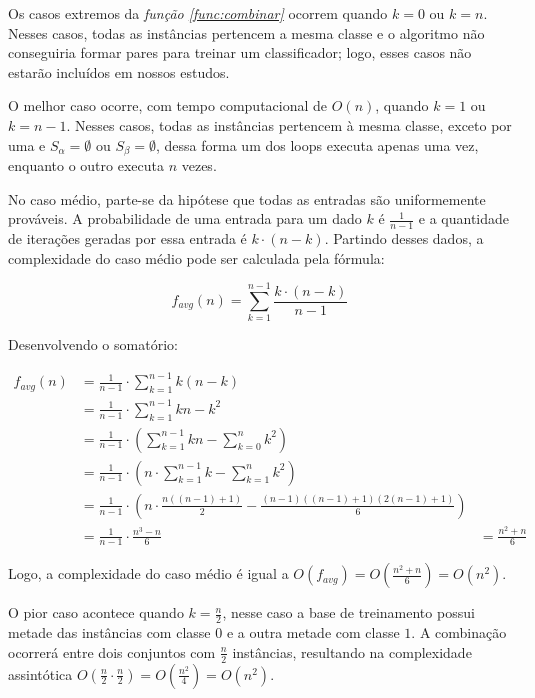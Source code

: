 Os casos extremos da \emph{função \ref{func:combinar}} ocorrem quando $k = 0$ ou $k = n$. Nesses casos, todas as instâncias pertencem a mesma classe e o algoritmo não conseguiria formar pares para treinar um classificador; logo, esses casos não estarão incluídos em nossos estudos.

O melhor caso ocorre, com tempo computacional de $O(n)$, quando $k = 1$ ou $k = n - 1$. Nesses casos, todas as instâncias pertencem à mesma classe, exceto por uma e $S_{\alpha} = \emptyset$ ou $S_{\beta} = \emptyset$, dessa forma um dos loops executa apenas uma vez, enquanto o outro executa $n$ vezes.

No caso médio, parte-se da hipótese que todas as entradas são uniformemente prováveis. A probabilidade de uma entrada para um dado $k$ é $\frac{1}{n - 1}$ e a quantidade de iterações geradas por essa entrada é $k \cdot (n - k)$. Partindo desses dados, a complexidade do caso médio pode ser calculada pela fórmula:

\[f_{avg}(n) = \sum_{k = 1}^{n - 1} \frac{k \cdot (n - k)}{n - 1}\]

Desenvolvendo o somatório:

\begin{align*}
    f_{avg}(n) &= \frac{1}{n - 1} \cdot \sum_{k = 1}^{n - 1} k(n - k) \\
               &= \frac{1}{n - 1} \cdot \sum_{k = 1}^{n - 1} kn - k^2 \\
               &= \frac{1}{n - 1} \cdot \left(\sum_{k = 1}^{n - 1} kn - \sum_{k = 0}^{n} k^2\right) \\
               &= \frac{1}{n - 1} \cdot \left(n \cdot \sum_{k = 1}^{n - 1} k - \sum_{k = 1}^{n} k^2\right) \\
               &= \frac{1}{n - 1} \cdot \left(n \cdot \frac{n((n - 1) + 1)}{2} - \frac{(n - 1)((n - 1) + 1)(2(n - 1) + 1)}{6}\right) \\
               &= \frac{1}{n - 1} \cdot \frac{n^3 - n}{6}
               &= \frac{n^2 + n}{6}
\end{align*}

Logo, a complexidade do caso médio é igual a $O(f_{avg}) = O(\frac{n^2 + n}{6}) = O(n^2)$.

O pior caso acontece quando $k = \frac{n}{2}$, nesse caso a base de treinamento possui metade das instâncias com classe $0$ e a outra metade com classe $1$. A combinação ocorrerá entre dois conjuntos com $\frac{n}{2}$ instâncias, resultando na complexidade assintótica $O(\frac{n}{2} \cdot \frac{n}{2}) = O(\frac{n^2}{4}) = O(n^2)$.

